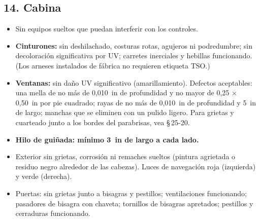 \subsection*{14. Cabina}
\begin{itemize}
\item Sin equipos sueltos que puedan interferir con los controles.
\item \textbf{Cinturones:} sin deshilachado, costuras rotas, agujeros ni podredumbre; sin decoloración significativa por UV; carretes inerciales y hebillas funcionando. (Los arneses instalados de fábrica no requieren etiqueta TSO.)
\item \textbf{Ventanas:} sin daño UV significativo (amarillamiento). Defectos aceptables: una mella de no más de 0,010~in de profundidad y no mayor de 0,25 × 0,50~in por pie cuadrado; rayas de no más de 0,010~in de profundidad y 5~in de largo; manchas que se eliminen con un pulido ligero. Para grietas y cuarteado junto a los bordes del parabrisas, vea \S\,25-20.
\item \textbf{Hilo de guiñada: mínimo 3~in de largo a cada lado.}
\item Exterior sin grietas, corrosión ni remaches sueltos (pintura agrietada o residuo negro alrededor de las cabezas). Luces de navegación roja (izquierda) y verde (derecha).
\item Puertas: sin grietas junto a bisagras y pestillos; ventilaciones funcionando; pasadores de bisagra con chaveta; tornillos de bisagras apretados; pestillos y cerraduras funcionando.
\end{itemize}

